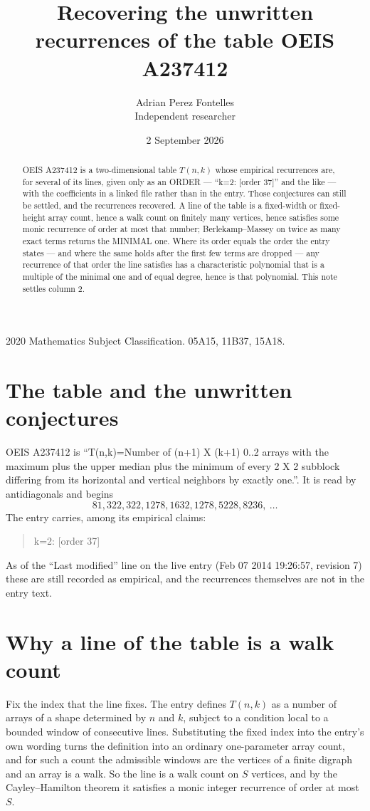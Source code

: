 \documentclass[11pt,a4paper]{article}
\title{Recovering the unwritten recurrences of the table OEIS A237412}
\author{Adrian Perez Fontelles\\ \small Independent researcher}
\date{2 September 2026}
\theoremstyle{plain}
\theoremstyle{definition}
\begin{document}
\maketitle

\begin{abstract}
OEIS A237412 is a two-dimensional table $T(n,k)$ whose empirical recurrences are, for several of
its lines, given only as an ORDER --- ``k=2: [order 37]'' and the like --- with the
coefficients in a linked file rather than in the entry. Those conjectures can still be settled,
and the recurrences recovered. A line of the table is a fixed-width or fixed-height array
count, hence a walk count on finitely many vertices, hence satisfies some monic recurrence of
order at most that number; Berlekamp--Massey on twice as many exact terms returns the MINIMAL
one. Where its order equals the order the entry states --- and where the same holds after the
first few terms are dropped --- any recurrence of that order the line satisfies has a
characteristic polynomial that is a multiple of the minimal one and of equal degree, hence is
that polynomial. This note settles column 2.
\end{abstract}

\noindent\small 2020 Mathematics Subject Classification. 05A15, 11B37, 15A18.\normalsize

\section{The table and the unwritten conjectures}

OEIS A237412 is ``T(n,k)=Number of (n+1) X (k+1) 0..2 arrays with the maximum plus the upper median plus the minimum of every 2 X 2 subblock differing from its horizontal and vertical neighbors by exactly one.''. It is read by antidiagonals and begins
\[
81, 322, 322, 1278, 1632, 1278, 5228, 8236,\ \dots
\]
The entry carries, among its empirical claims:
\begin{quote}\small
k=2: [order 37]
\end{quote}
As of the ``Last modified'' line on the live entry (Feb 07 2014 19:26:57, revision 7) these are still
recorded as empirical, and the recurrences themselves are not in the entry text.

\section{Why a line of the table is a walk count}

Fix the index that the line fixes. The entry defines $T(n,k)$ as a number of arrays of a shape
determined by $n$ and $k$, subject to a condition local to a bounded window of consecutive
lines. Substituting the fixed index into the entry's own wording turns the definition into an
ordinary one-parameter array count, and for such a count the admissible windows are the
vertices of a finite digraph and an array is a walk. So the line is a walk count on $S$
vertices, and by the Cayley--Hamilton theorem it satisfies a monic integer recurrence of order
at most $S$.
\end{document}

